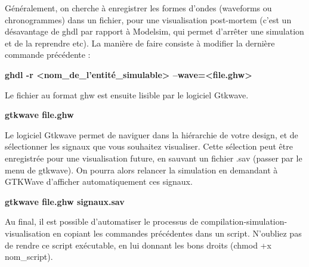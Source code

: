 Généralement, on cherche à enregistrer les formes d'ondes (waveforms ou chronogrammes) dans un fichier, pour une visualisation post-mortem (c'est un désavantage de ghdl par rapport à Modelsim, qui permet d'arrêter une simulation et de la reprendre etc). La manière de faire consiste à modifier la dernière commande précédente :

    \textbf{ghdl -r <nom\_de\_l'entité\_simulable> --wave=<file.ghw>}

Le fichier au format ghw est ensuite lisible par le logiciel Gtkwave.

    \textbf{gtkwave file.ghw}

Le logiciel Gtkwave permet de naviguer dans la hiérarchie de votre design, et de sélectionner les signaux que vous souhaitez visualiser.
Cette sélection peut être enregistrée pour une visualisation future, en sauvant un fichier .sav (passer par le menu de gtkwave). On pourra alors
relancer la simulation en demandant à GTKWave d'afficher automatiquement ces signaux.

   \textbf{gtkwave file.ghw signaux.sav}

Au final, il est possible d'automatiser le processus de compilation-simulation-visualisation en copiant les commandes précédentes dans un script.
N'oubliez pas de rendre ce script exécutable, en lui donnant les bons droits (chmod +x nom\_script).
